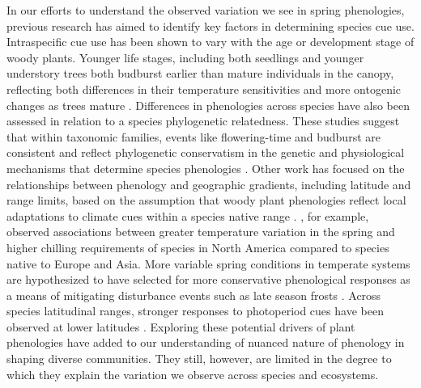 \documentclass{article}\usepackage[]{graphicx}\usepackage[]{color}
\begin{document}
In our efforts to understand the observed variation we see in spring phenologies, previous research has aimed to identify key factors in determining species cue use. Intraspecific cue use has been shown to vary with the age or development stage of woody plants. Younger life stages, including both seedlings and younger understory trees both budburst earlier than mature individuals in the canopy, reflecting both differences in their temperature sensitivities and more ontogenic changes as trees mature \citep{Vitasse2013, Seiwa1999}. Differences in phenologies across species have also been assessed in relation to a species phylogenetic relatedness. These studies suggest that within taxonomic families, events like flowering-time and budburst are consistent and reflect phylogenetic conservatism in the genetic and physiological mechanisms that determine species phenologies \citep{Kochmer1986, Davies2013}. Other work has focused on the relationships between phenology and geographic gradients, including latitude and range limits, based on the assumption that woody plant phenologies reflect local adaptations to climate cues within a species native range \citep{Lechowicz1984, Chuine2001, Chuine2010}. \citep{Zohner2017}, for example, observed associations between greater temperature variation in the spring and higher chilling requirements of species in North America compared to species native to Europe and Asia. More variable spring conditions in temperate systems are hypothesized to have selected for more conservative phenological responses as a means of mitigating disturbance events such as late season frosts \citep{citations}. Across species latitudinal ranges, stronger responses to photoperiod cues have been observed at lower latitudes \citep{citation}. Exploring these potential drivers of plant phenologies have added to our understanding of nuanced nature of phenology in shaping diverse communities. They still, however, are limited in the degree to which they explain the variation we observe across species and ecosystems.
\end{document}
